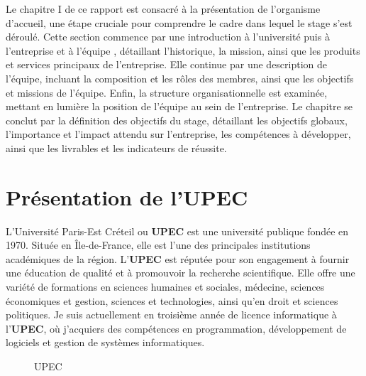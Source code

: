 Le chapitre I de ce rapport est consacré à la présentation de l’organisme d’accueil, une étape cruciale pour comprendre le cadre dans lequel le stage s’est déroulé. Cette section commence par une introduction à l'université puis à l’entreprise et à l’équipe , détaillant l'historique, la mission, ainsi que les produits et services principaux de l'entreprise. Elle continue par une description de l’équipe, incluant la composition et les rôles des membres, ainsi que les objectifs et missions de l’équipe. Enfin, la structure organisationnelle est examinée, mettant en lumière la position de l’équipe au sein de l’entreprise. Le chapitre se conclut par la définition des objectifs du stage, détaillant les objectifs globaux, l'importance et l’impact attendu sur l’entreprise, les compétences à développer, ainsi que les livrables et les indicateurs de réussite.
\section{Présentation de l’UPEC}

L'Université Paris-Est Créteil ou \textbf{UPEC} est une université publique fondée en 1970. Située en Île-de-France, elle est l'une des principales institutions académiques de la région. L'\textbf{UPEC} est réputée pour son engagement à fournir une éducation de qualité et à promouvoir la recherche scientifique. Elle offre une variété de formations en sciences humaines et sociales, médecine, sciences économiques et gestion, sciences et technologies, ainsi qu'en droit et sciences politiques.
Je suis actuellement en troisième année de licence informatique à l'\textbf{UPEC}, où j'acquiers des compétences en programmation, développement de logiciels et gestion de systèmes informatiques.

\begin{figure}[H]
	\begin{center}
		\caption{UPEC}
	\end{center}
\end{figure}

